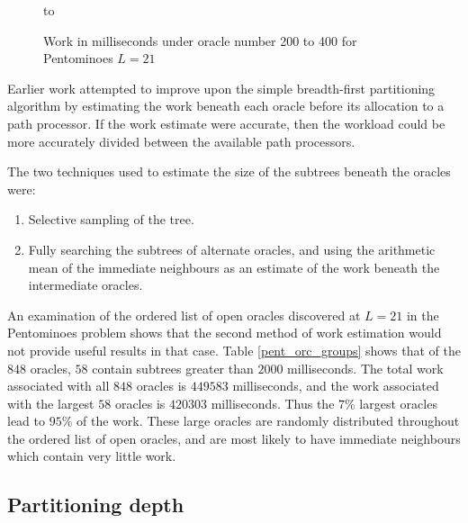 \begin{figure}[htbp]
\vspace{5mm} \hbox to 
\caption{Work in milliseconds under oracle number 200 to 400 for Pentominoes $L=21$}
\vspace{5mm}
\label{pent_orcs_200_to_400}
\end{figure}

Earlier work \cite{Sar95} attempted to improve upon the simple breadth-first partitioning
algorithm by estimating the work beneath each oracle before its allocation to a path processor.
If the work estimate were accurate, then the workload could be more accurately divided between
the available path processors.

The two techniques used to estimate the size of the subtrees beneath the oracles were:
\begin{enumerate}
\item{Selective sampling of the tree.}
\item{Fully searching the subtrees of alternate oracles, and using the arithmetic mean of the
immediate neighbours as an estimate of the work beneath the intermediate oracles.}
\end{enumerate}

An examination of the ordered list of open oracles discovered at $L=21$ in the 
Pentominoes problem shows that the second method of work estimation would not 
provide useful results in that case.  Table \ref{pent_orc_groups} shows that of
the $848$ oracles, $58$ contain subtrees greater than $2000$ milliseconds.  The
total work associated with all $848$ oracles is $449583$ milliseconds, and the work
associated with the largest $58$ oracles is $420303$ milliseconds.  Thus the $7$\%
largest oracles lead to $95$\% of the work.  These large oracles are randomly
distributed throughout the ordered list of open oracles,
and are most likely to have immediate neighbours which contain very little work.


\subsection{Partitioning depth}

